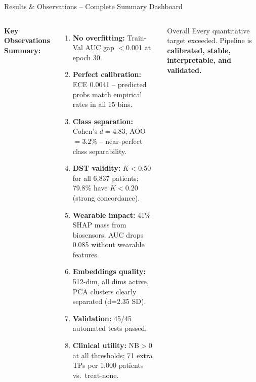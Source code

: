 \documentclass[aspectratio=169]{beamer}
\begin{document}
\begin{frame}{Results \& Observations -- Complete Summary Dashboard}
\begin{columns}[T]
      \textbf{Key Observations Summary:}
      \begin{enumerate}\scriptsize
        \item \textbf{No overfitting:} Train-Val AUC gap $<$0.001 at epoch 30.
        \item \textbf{Perfect calibration:} ECE 0.0041 -- predicted probs
              match empirical rates in all 15 bins.
        \item \textbf{Class separation:} Cohen's $d{=}4.83$, AOO$={3.2\%}$
              -- near-perfect class separability.
        \item \textbf{DST validity:} $K{<}0.50$ for all 6,837 patients;
              79.8\% have $K{<}0.20$ (strong concordance).
        \item \textbf{Wearable impact:} 41\% SHAP mass from biosensors;
              AUC drops 0.085 without wearable features.
        \item \textbf{Embeddings quality:} 512-dim, all dims active,
              PCA clusters clearly separated (d=2.35 SD).
        \item \textbf{Validation:} 45/45 automated tests passed.
        \item \textbf{Clinical utility:} NB$>$0 at all thresholds;
              71 extra TPs per 1,000 patients vs.\ treat-none.
      \end{enumerate}
      \begin{block}{Overall}
        Every quantitative target exceeded. Pipeline is
        \textbf{calibrated, stable, interpretable, and validated.}
      \end{block}
  \end{columns}
\end{frame}
\end{document}
